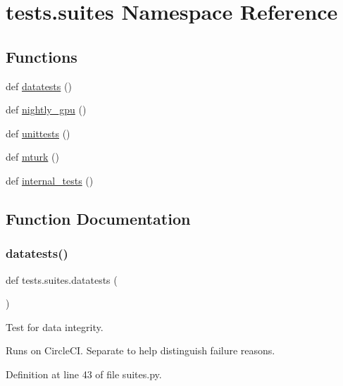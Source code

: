 \hypertarget{namespacetests_1_1suites}{}\section{tests.\+suites Namespace Reference}
\label{namespacetests_1_1suites}
\subsection*{Functions}
\begin{DoxyCompactItemize}
\item 
def \hyperlink{namespacetests_1_1suites_a1e7ee73a4d3645058850bc743ad6b668}{datatests} ()
\item 
def \hyperlink{namespacetests_1_1suites_ab1df665f54fccb5bbceb95cf8e4498b9}{nightly\+\_\+gpu} ()
\item 
def \hyperlink{namespacetests_1_1suites_a02a7d577493ceb024319292b96e13265}{unittests} ()
\item 
def \hyperlink{namespacetests_1_1suites_a5d5a0bb14f72dd9c86a97cc6ca6add87}{mturk} ()
\item 
def \hyperlink{namespacetests_1_1suites_aaa84dd961fb392c540b3a116119be21c}{internal\+\_\+tests} ()
\end{DoxyCompactItemize}


\subsection{Function Documentation}
\mbox{\label{namespacetests_1_1suites_a1e7ee73a4d3645058850bc743ad6b668}} 
\subsubsection{\texorpdfstring{datatests()}{datatests()}}
{\footnotesize\ttfamily def tests.\+suites.\+datatests (\begin{DoxyParamCaption}{ }\end{DoxyParamCaption})}

\begin{DoxyVerb}Test for data integrity.

Runs on CircleCI. Separate to help distinguish failure reasons.
\end{DoxyVerb}
 

Definition at line 43 of file suites.\+py.


